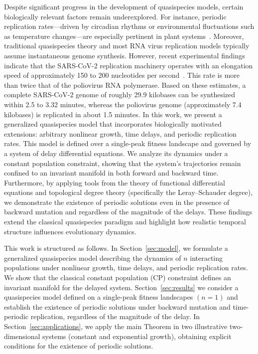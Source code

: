 \documentclass[11pt,reqno]{amsart}
\theoremstyle{definition}
\begin{document}
Despite significant progress in the development of quasispecies models, certain biologically relevant factors remain underexplored. For instance, periodic replication rates—driven by circadian rhythms or environmental fluctuations such as temperature changes—are especially pertinent in plant systems~\cite{Obreepalska2015,Honjo2020}. Moreover, traditional quasispecies theory and most RNA virus replication models typically assume instantaneous genome synthesis. However, recent experimental findings indicate that the SARS-CoV-2 replication machinery operates with an elongation speed of approximately 150 to 200 nucleotides per second~\cite{Campagnola2022}. This rate is more than twice that of the poliovirus RNA polymerase. Based on these estimates, a complete SARS-CoV-2 genome of roughly 29.9 kilobases can be synthesized within 2.5 to 3.32 minutes, whereas the poliovirus genome (approximately 7.4 kilobases) is replicated in about 1.5 minutes.
In this work, we present a generalized quasispecies model that incorporates biologically motivated extensions: arbitrary nonlinear growth, time delays, and periodic replication rates.
This model is defined over a single-peak fitness landscape and governed by a system of delay differential equations. 
We analyze its dynamics under a constant population constraint, showing that the system's trajectories remain confined to an invariant manifold in both forward and backward time. Furthermore, by applying tools from the theory of functional differential equations and topological degree theory (specifically the Leray–Schauder degree), we demonstrate the existence of periodic solutions even in the presence of backward mutation and regardless of the magnitude of the delays. These findings extend the classical quasispecies paradigm and highlight how realistic temporal structure influences evolutionary dynamics.

This work is structured as follows. In Section~\ref{sec:model}, we formulate a generalized quasispecies model describing the dynamics of $n$ interacting populations under nonlinear growth, time delays, and periodic replication rates. We show that the classical constant population (CP) constraint defines an invariant manifold for the delayed system.
Section~\ref{sec:results} we consider a quasispecies model defined on a single-peak fitness landscapes $(n=1)$ and establish the existence of periodic solutions under backward mutation and time-periodic replication, regardless of the magnitude of the delay.
In Section~\ref{sec:applications}, we apply the main Theorem in two illustrative two-dimensional systems (constant and exponential growth), obtaining explicit conditions for the existence of periodic solutions.
\end{document}
